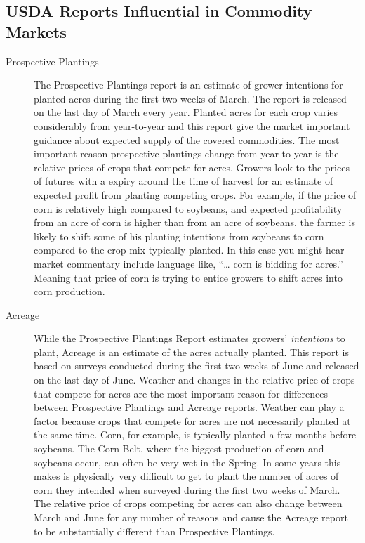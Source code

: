 \documentclass[
]{book}
\begin{document}
\hypertarget{usda-reports-influential-in-commodity-markets}{%
\subsection{USDA Reports Influential in Commodity Markets}\label{usda-reports-influential-in-commodity-markets}}

\begin{description}
\item[Prospective Plantings]
The Prospective Plantings report is an estimate of grower intentions for planted acres during the first two weeks of March. The report is released on the last day of March every year. Planted acres for each crop varies considerably from year-to-year and this report give the market important guidance about expected supply of the covered commodities. The most important reason prospective plantings change from year-to-year is the relative prices of crops that compete for acres. Growers look to the prices of futures with a expiry around the time of harvest for an estimate of expected profit from planting competing crops. For example, if the price of corn is relatively high compared to soybeans, and expected profitability from an acre of corn is higher than from an acre of soybeans, the farmer is likely to shift some of his planting intentions from soybeans to corn compared to the crop mix typically planted. In this case you might hear market commentary include language like, ``\ldots{} corn is bidding for acres.'' Meaning that price of corn is trying to entice growers to shift acres into corn production.
\item[Acreage]
While the Prospective Plantings Report estimates growers' \emph{intentions} to plant, Acreage is an estimate of the acres actually planted. This report is based on surveys conducted during the first two weeks of June and released on the last day of June. Weather and changes in the relative price of crops that compete for acres are the most important reason for differences between Prospective Plantings and Acreage reports. Weather can play a factor because crops that compete for acres are not necessarily planted at the same time. Corn, for example, is typically planted a few months before soybeans. The Corn Belt, where the biggest production of corn and soybeans occur, can often be very wet in the Spring. In some years this makes is physically very difficult to get to plant the number of acres of corn they intended when surveyed during the first two weeks of March. The relative price of crops competing for acres can also change between March and June for any number of reasons and cause the Acreage report to be substantially different than Prospective Plantings.

\end{description}
\end{document}
